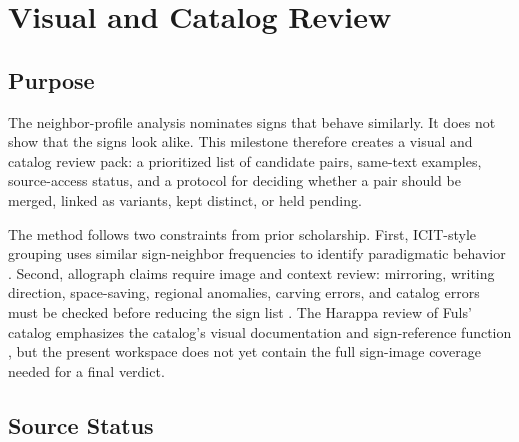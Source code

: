 \section{Visual and Catalog Review}

\subsection{Purpose}

The neighbor-profile analysis nominates signs that behave similarly. It does not show that the signs look alike. This milestone therefore creates a visual and catalog review pack: a prioritized list of candidate pairs, same-text examples, source-access status, and a protocol for deciding whether a pair should be merged, linked as variants, kept distinct, or held pending.

The method follows two constraints from prior scholarship. First, ICIT-style grouping uses similar sign-neighbor frequencies to identify paradigmatic behavior \citep{fulsICIT}. Second, allograph claims require image and context review: mirroring, writing direction, space-saving, regional anomalies, carving errors, and catalog errors must be checked before reducing the sign list \citep{daggumati2021allographs}. The Harappa review of Fuls' catalog emphasizes the catalog's visual documentation and sign-reference function \citep{harappaCatalog2026}, but the present workspace does not yet contain the full sign-image coverage needed for a final verdict.

\subsection{Source Status}

